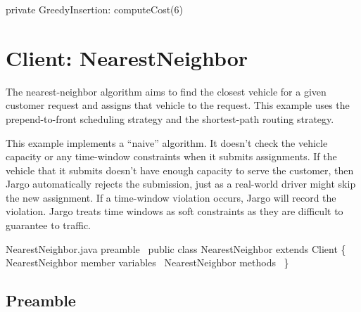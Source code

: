 \nwenddocs{}\plusendmoddef\nwstartdeflinemarkup{}\nwenddeflinemarkup
private \LA{}GreedyInsertion: computeCost(6)~{\nwtagstyle{}}\RA{}
\nwendcode{}\nwdocspar

\nwenddocs{}\chapter{Client: NearestNeighbor}
\label{client-nearest}

The nearest-neighbor algorithm aims to find the closest vehicle for a given
customer request and assigns that vehicle to the request. This example uses the
prepend-to-front scheduling strategy and the shortest-path routing strategy.

This example implements a ``naive'' algorithm. It doesn't check the vehicle
capacity or any time-window constraints when it submits assignments. If the
vehicle that it submits doesn't have enough capacity to serve the customer,
then Jargo automatically rejects the submission, just as a real-world driver
might skip the new assignment. If a time-window violation occurs, Jargo will
record the violation. Jargo treats time windows as soft constraints as they are
difficult to guarantee to traffic.

\nwenddocs{}\endmoddef\nwstartdeflinemarkup\nwenddeflinemarkup
\LA{}NearestNeighbor.java preamble~{\nwtagstyle{}}\RA{}
public class NearestNeighbor extends Client \{
  \LA{}\code{}NearestNeighbor\edoc{} member variables~{\nwtagstyle{}}\RA{}
  \LA{}\code{}NearestNeighbor\edoc{} methods~{\nwtagstyle{}}\RA{}
\}
\nwendcode{}\nwdocspar

\section{Preamble}
\label{NearestNeighbor: preamble}

